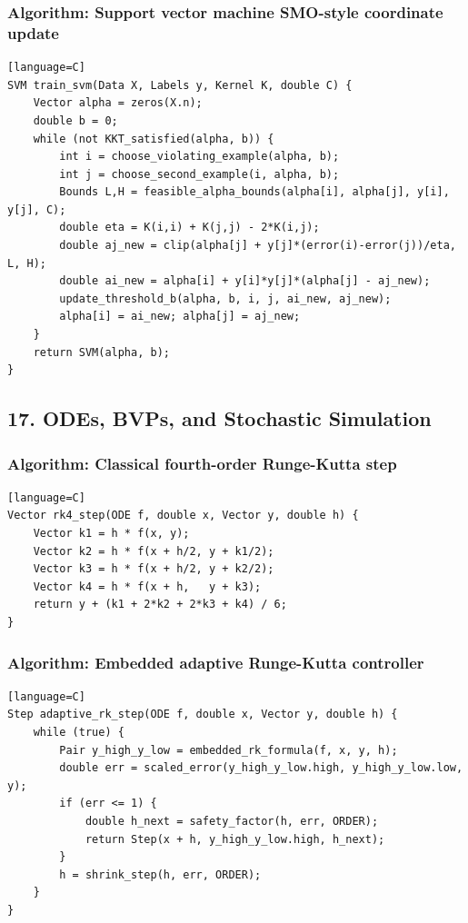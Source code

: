 \documentclass[11pt]{article}
\begin{document}
\subsubsection{Algorithm: Support vector machine SMO-style coordinate update}\label{algorithm-support-vector-machine-smo-style-coordinate-update}

\begin{verbatim}[language=C]
SVM train_svm(Data X, Labels y, Kernel K, double C) {
    Vector alpha = zeros(X.n);
    double b = 0;
    while (not KKT_satisfied(alpha, b)) {
        int i = choose_violating_example(alpha, b);
        int j = choose_second_example(i, alpha, b);
        Bounds L,H = feasible_alpha_bounds(alpha[i], alpha[j], y[i], y[j], C);
        double eta = K(i,i) + K(j,j) - 2*K(i,j);
        double aj_new = clip(alpha[j] + y[j]*(error(i)-error(j))/eta, L, H);
        double ai_new = alpha[i] + y[i]*y[j]*(alpha[j] - aj_new);
        update_threshold_b(alpha, b, i, j, ai_new, aj_new);
        alpha[i] = ai_new; alpha[j] = aj_new;
    }
    return SVM(alpha, b);
}
\end{verbatim}

\subsection{17. ODEs, BVPs, and Stochastic Simulation}\label{odes-bvps-and-stochastic-simulation}

\subsubsection{Algorithm: Classical fourth-order Runge-Kutta step}\label{algorithm-classical-fourth-order-runge-kutta-step}

\begin{verbatim}[language=C]
Vector rk4_step(ODE f, double x, Vector y, double h) {
    Vector k1 = h * f(x, y);
    Vector k2 = h * f(x + h/2, y + k1/2);
    Vector k3 = h * f(x + h/2, y + k2/2);
    Vector k4 = h * f(x + h,   y + k3);
    return y + (k1 + 2*k2 + 2*k3 + k4) / 6;
}
\end{verbatim}

\subsubsection{Algorithm: Embedded adaptive Runge-Kutta controller}\label{algorithm-embedded-adaptive-runge-kutta-controller}

\begin{verbatim}[language=C]
Step adaptive_rk_step(ODE f, double x, Vector y, double h) {
    while (true) {
        Pair y_high_y_low = embedded_rk_formula(f, x, y, h);
        double err = scaled_error(y_high_y_low.high, y_high_y_low.low, y);
        if (err <= 1) {
            double h_next = safety_factor(h, err, ORDER);
            return Step(x + h, y_high_y_low.high, h_next);
        }
        h = shrink_step(h, err, ORDER);
    }
}
\end{verbatim}
\end{document}
